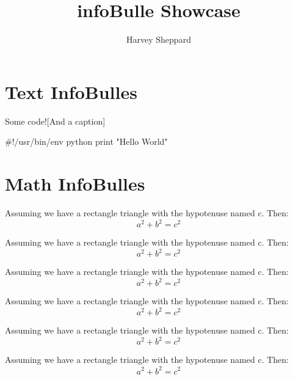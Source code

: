 \documentclass{article}
\title{infoBulle Showcase}
\author{Harvey Sheppard}
\begin{document}
	
	\maketitle
	
	\section{Text InfoBulles}
	
	\infoInfo{\lipsum[2]}{\lipsum[2]}
	
	
	
	
	
	
	\begin{CodeInfo}{Some code!}[And a caption]
		\begin{CodeInfoLst}
#!/usr/bin/env python
print "Hello World"
		\end{CodeInfoLst}
		\lipsum[2]
	\end{CodeInfo}
	
	\section{Math InfoBulles}
	
	\begin{theorem}[Pythagoras]
		Assuming we have a rectangle triangle with the hypotenuse named c. Then:
		\[
		a^2 + b^2 = c^2
		\]
	\end{theorem}
	
	\begin{lemma}[Pythagoras]
		Assuming we have a rectangle triangle with the hypotenuse named c. Then:
		\[
		a^2 + b^2 = c^2
		\]
	\end{lemma}
	
	\begin{axiom}[Pythagoras]
		Assuming we have a rectangle triangle with the hypotenuse named c. Then:
		\[
		a^2 + b^2 = c^2
		\]
	\end{axiom}
	
	\begin{proposition}[Pythagoras]
		Assuming we have a rectangle triangle with the hypotenuse named c. Then:
		\[
		a^2 + b^2 = c^2
		\]
	\end{proposition}
	
	\begin{definition}[Pythagoras]
		Assuming we have a rectangle triangle with the hypotenuse named c. Then:
		\[
		a^2 + b^2 = c^2
		\]
	\end{definition}
	
	\begin{corollary}[Pythagoras]
		Assuming we have a rectangle triangle with the hypotenuse named c. Then:
		\[
		a^2 + b^2 = c^2
		\]
	\end{corollary}
	
	
\end{document}
